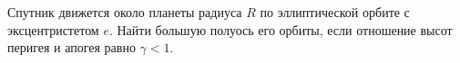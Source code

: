 Спутник движется около планеты радиуса $R$ по эллиптической орбите с эксцентристетом $e$. Найти большую полуось его орбиты, 
если отношение высот перигея и апогея равно $\gamma < 1$.

